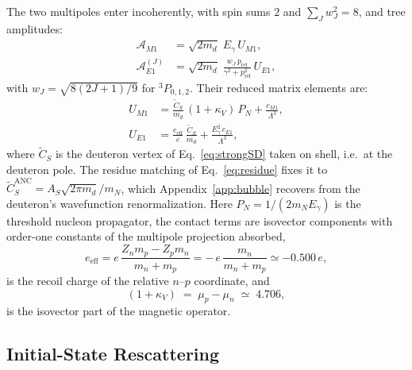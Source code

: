 \documentclass[
  aps,prd,twocolumn,nofootinbib,superscriptaddress,
  longbibliography,floatfix,preprintnumbers
]{revtex4-2}
\newcommand{\prel}{p_{\mathrm{rel}}}
\newcommand{\Egam}{E_{\gamma}}
\newcommand{\kappaV}{\kappa_{V}}
\newcommand{\Mone}{M1}
\newcommand{\Eone}{E1}
\newcommand{\AS}{A_{S}}
\newcommand{\CSv}{\tilde{C}_{S}}
\begin{document}
The two multipoles enter incoherently, with spin sums $2$ and
$\sum_{J}w_{J}^{2}=8$, and tree amplitudes:
\begin{align}
  \mathcal{A}_{\Mone} &= \sqrt{2m_{d}}\;\Egam\,U_{\Mone},
  \label{eq:AM1tree}\\
  \mathcal{A}_{\Eone}^{(J)} &= \sqrt{2m_{d}}\;
     \frac{w_{J}\,\prel}{\gamma^{2}+\prel^{2}}\,U_{\Eone},
  \label{eq:AE1tree}
\end{align}
with $w_{J}=\sqrt{8(2J+1)/9}$ for ${}^{3}P_{0,1,2}$. Their reduced matrix
elements are:
\begin{align}
  U_{\Mone} &= \frac{\CSv}{m_{d}}\,(1+\kappaV)\,P_N
               + \frac{c_{\Mone}}{\Lambda^{3}}, \label{eq:UM1np}\\
  U_{\Eone} &= \frac{e_{\mathrm{eff}}}{e}\,\frac{\CSv}{m_{d}}
               + \frac{\Egam^{2}\,c_{\Eone}}{\Lambda^{3}}, \label{eq:UE1np}
\end{align}
where $\CSv$ is the deuteron vertex of Eq.~\eqref{eq:strongSD} taken on shell,
i.e.\ at the deuteron pole. The residue matching of Eq.~\eqref{eq:residue} fixes
it to $\CSv^{\mathrm{ANC}}=\AS\sqrt{2\pi m_{d}}/m_{N}$, which
Appendix~\ref{app:bubble} recovers from the deuteron's wavefunction
renormalization. Here $P_N=1/(2m_N\Egam)$ is the threshold nucleon propagator, the contact terms
are isovector components with order-one constants of the multipole projection absorbed,
\begin{equation}
  e_{\mathrm{eff}} = e\,\frac{Z_{n}m_{p}-Z_{p}m_{n}}{m_{n}+m_{p}}
                   = -\,e\,\frac{m_{n}}{m_{n}+m_{p}} \simeq -0.500\,e ,
  \label{eq:eeff}
\end{equation}
is the recoil charge of the relative $n$--$p$ coordinate, and
\begin{equation}
  (1+\kappaV) \;=\; \mu_p-\mu_n \;\simeq\; 4.706 ,
  \label{eq:isovector}
\end{equation}
is the isovector part of the magnetic operator.

\subsection{Initial-State Rescattering}
\label{sec:isi}
\end{document}
